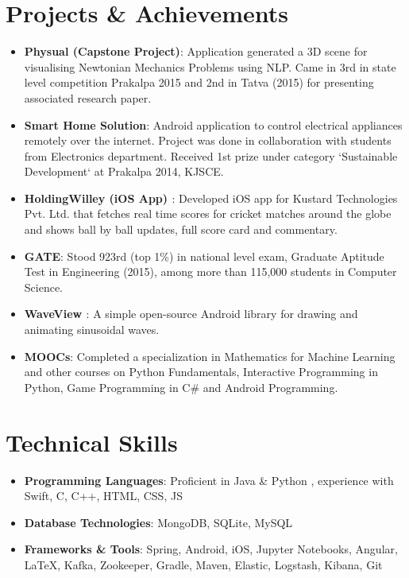\documentclass[letterpaper,11pt]{article}
\newcommand{\resumeItem}[2]{
	\item\normalsize{
		\textbf{#1}{: #2}
	}
}
\newcommand{\resumeSubItem}[2]{\resumeItem{#1}{#2}\vspace{-4pt}}
\newcommand{\resumeSubHeadingListStart}{\begin{itemize}[leftmargin=*]}
\newcommand{\resumeSubHeadingListEnd}{\end{itemize}}
\begin{document}
	\section{Projects \& Achievements}
	\resumeSubHeadingListStart
	\resumeSubItem{Physual (Capstone Project)}
	{Application generated a 3D scene for visualising Newtonian Mechanics Problems using NLP. Came in 3rd in state level competition Prakalpa 2015 and 2nd in Tatva (2015) for presenting associated research paper.}
	\resumeSubItem{Smart Home Solution}
	{Android application to control electrical appliances remotely over the internet. Project was done in collaboration with students from Electronics department. Received 1st prize under category ‘Sustainable Development‘ at Prakalpa 2014, KJSCE.}
	\resumeSubItem{HoldingWilley (iOS App) \href{https://apps.apple.com/app/id1229976116}{\faApple}}
	{Developed iOS app for Kustard Technologies Pvt. Ltd. that fetches real time scores for cricket matches around the globe and shows ball by ball updates, full score card and  commentary.}
	\resumeSubItem{GATE}
	{Stood 923rd (top 1\%) in national level exam, Graduate Aptitude Test in Engineering (2015), among more than 115,000 students in Computer Science.}
	\resumeSubItem{WaveView \href{https://github.com/narayanacharya6/WaveView}{\faGithub}}
	{A simple open-source Android library for drawing and animating sinusoidal waves.}
	\resumeSubItem{MOOCs}
	{Completed a specialization in Mathematics for Machine Learning and other courses on Python Fundamentals, Interactive Programming in Python, Game Programming in C\# and Android Programming.}
	\resumeSubHeadingListEnd
	
	
	\section{Technical Skills}
	\resumeSubHeadingListStart
	\item{
		\textbf{Programming Languages}{: Proficient in Java \& Python , experience with Swift, C, C++, HTML, CSS, JS}}
	\vspace{-8pt}
	\item{
		\textbf{Database Technologies}{: MongoDB, SQLite, MySQL}}
	\vspace{-8pt}
	\item{
		\textbf{Frameworks \& Tools}{: Spring, Android, iOS, Jupyter Notebooks, Angular, \LaTeX, Kafka, Zookeeper, Gradle, Maven, Elastic, Logstash, Kibana, Git}}
	\resumeSubHeadingListEnd
	
	
\end{document}
